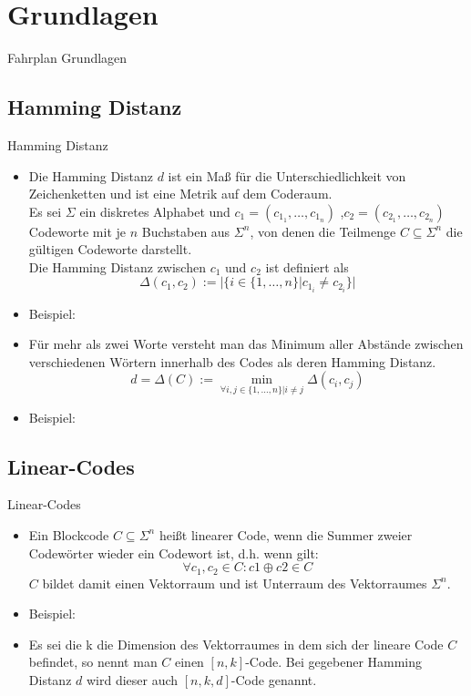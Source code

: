 \documentclass[11pt%
,aspectratio=169%
]{beamer}
\begin{document}
\section{Grundlagen}

\begin{frame}{Fahrplan Grundlagen}
\end{frame}

\subsection{Hamming Distanz}
\begin{frame}{Hamming Distanz}
	\begin{itemize}
		\item Die Hamming Distanz $d$ ist ein Maß für die Unterschiedlichkeit von Zeichenketten und ist eine Metrik auf dem Coderaum.
		\\Es sei $\Sigma$ ein diskretes Alphabet und $c_1=(c_{1_1},\ldots,c_{1_n})$ ,$c_2=(c_{2_1},\ldots,c_{2_n})$ Codeworte mit je $n$ Buchstaben aus $\Sigma^n$, von denen die Teilmenge  $C\subseteq\Sigma^n$ die gültigen Codeworte darstellt. 
		\\Die Hamming Distanz zwischen $c_1$ und $c_2$ ist definiert als \[\Delta(c_1,c_2):=|\{i \in \{1,\ldots,n\}| c_{1_i}\neq c_{2_i} \}|\]
		\item Beispiel:
		\item Für mehr als zwei Worte versteht man das Minimum aller Abstände zwischen verschiedenen Wörtern innerhalb des Codes als deren Hamming Distanz.
		\[d=\Delta(C):= \min_{\forall i,j \in \{1,\ldots,n\}|i\neq j}\Delta(c_i,c_j)\]
		\item Beispiel:
	
		
	\end{itemize}
\end{frame}

\subsection{Linear-Codes}
\begin{frame}{Linear-Codes}
	\begin{itemize}
		\item Ein Blockcode $C\subseteq\Sigma^n$ heißt linearer Code, wenn die Summer zweier Codewörter wieder ein Codewort ist, d.h. wenn gilt:
			\[\forall c_1,c_2 \in C \colon c1\oplus c2 \in C \]
			$C$ bildet damit einen Vektorraum und ist Unterraum des Vektorraumes $\Sigma^n$.
			\item Beispiel:
			\item Es sei die k die Dimension des Vektorraumes in dem sich der lineare Code $C$ befindet, so nennt man $C$ einen $[n,k]$-Code. Bei gegebener Hamming Distanz $d$ wird dieser auch $[n,k,d]$-Code genannt.
	
	\end{itemize}
\end{frame}
\end{document}
